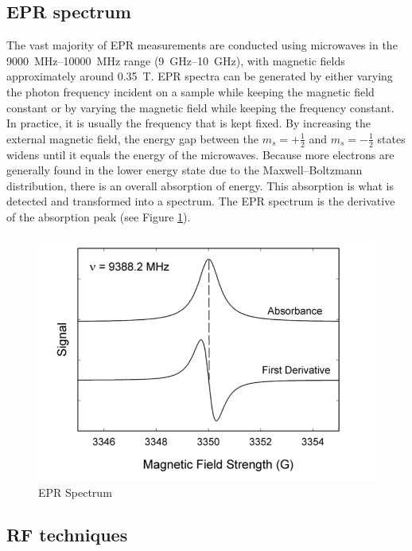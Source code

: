 \documentclass{article}
\begin{document}
\subsection{EPR spectrum}
The vast majority of EPR measurements are conducted using microwaves in the \SIrange{9000}{10000}{MHz} range (\SIrange{9}{10}{GHz}), with magnetic fields approximately around \SI{0.35}{T}. EPR spectra can be generated by either varying the photon frequency incident on a sample while keeping the magnetic field constant or by varying the magnetic field while keeping the frequency constant. In practice, it is usually the frequency that is kept fixed. By increasing the external magnetic field, the energy gap between the  $m_s = +\frac{1}{2}$ and  $m_s = -\frac{1}{2}$ states widens until it equals the energy of the microwaves. Because more electrons are generally found in the lower energy state due to the Maxwell–Boltzmann distribution, there is an overall absorption of energy. This absorption is what is detected and transformed into a spectrum. The EPR spectrum is the derivative of the absorption peak (see Figure \ref{fig:eprspectrum}). 
\begin{figure}[h]
    \centering
    \includegraphics[width=0.5\linewidth]{Figures/Intro/2.png}
    \caption{EPR Spectrum \cite{wikipediacontributors_2019_electron}}
    \label{fig:eprspectrum}
\end{figure}

\subsection{RF techniques}
\end{document}
